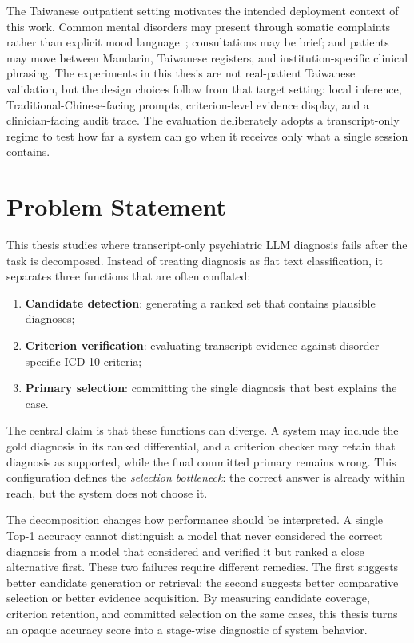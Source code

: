 The Taiwanese outpatient setting motivates the intended deployment context of this work. Common mental disorders may present through somatic complaints rather than explicit mood language~\citep{ryder2008somatic}; consultations may be brief; and patients may move between Mandarin, Taiwanese registers, and institution-specific clinical phrasing. The experiments in this thesis are not real-patient Taiwanese validation, but the design choices follow from that target setting: local inference, Traditional-Chinese-facing prompts, criterion-level evidence display, and a clinician-facing audit trace. The evaluation deliberately adopts a transcript-only regime to test how far a system can go when it receives only what a single session contains.

\section{Problem Statement}

This thesis studies where transcript-only psychiatric LLM diagnosis fails after the task is decomposed. Instead of treating diagnosis as flat text classification, it separates three functions that are often conflated:

\begin{enumerate}[label=\arabic*.]
\item \textbf{Candidate detection}: generating a ranked set that contains plausible diagnoses;
\item \textbf{Criterion verification}: evaluating transcript evidence against disorder-specific ICD-10 criteria;
\item \textbf{Primary selection}: committing the single diagnosis that best explains the case.
\end{enumerate}

The central claim is that these functions can diverge. A system may include the gold diagnosis in its ranked differential, and a criterion checker may retain that diagnosis as supported, while the final committed primary remains wrong. This configuration defines the \emph{selection bottleneck}: the correct answer is already within reach, but the system does not choose it.

The decomposition changes how performance should be interpreted. A single Top-1 accuracy cannot distinguish a model that never considered the correct diagnosis from a model that considered and verified it but ranked a close alternative first. These two failures require different remedies. The first suggests better candidate generation or retrieval; the second suggests better comparative selection or better evidence acquisition. By measuring candidate coverage, criterion retention, and committed selection on the same cases, this thesis turns an opaque accuracy score into a stage-wise diagnostic of system behavior.


